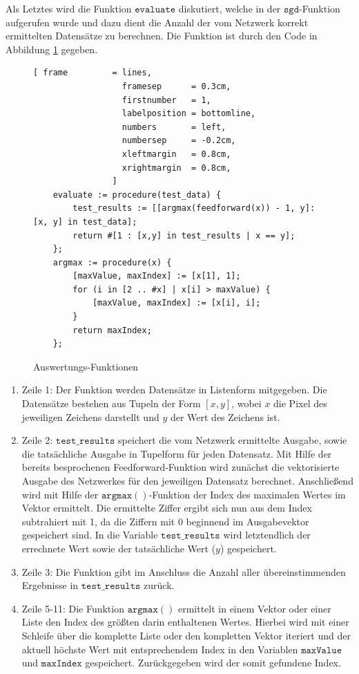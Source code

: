 \noindent
Als Letztes wird die Funktion $\mathtt{evaluate}$ diskutiert, welche in der $\mathtt{sgd}$-Funktion aufgerufen wurde und dazu dient die Anzahl der vom Netzwerk korrekt ermittelten Datensätze zu berechnen. Die Funktion ist durch den Code in Abbildung \ref{fig:eval_func} gegeben.
\begin{figure}
\begin{Verbatim}[ frame         = lines, 
                  framesep      = 0.3cm, 
                  firstnumber   = 1,
                  labelposition = bottomline,
                  numbers       = left,
                  numbersep     = -0.2cm,
                  xleftmargin   = 0.8cm,
                  xrightmargin  = 0.8cm,
                ]
    evaluate := procedure(test_data) {
        test_results := [[argmax(feedforward(x)) - 1, y]: [x, y] in test_data];	
        return #[1 : [x,y] in test_results | x == y];
    };
    argmax := procedure(x) {
        [maxValue, maxIndex] := [x[1], 1];
        for (i in [2 .. #x] | x[i] > maxValue) {
            [maxValue, maxIndex] := [x[i], i];
        }
        return maxIndex;
    };
\end{Verbatim}
\vspace*{-0.3cm}
\caption{Auswertungs-Funktionen}
\label{fig:eval_func}
\end{figure}
\begin{enumerate}
\item Zeile 1: Der Funktion werden Datensätze in Listenform mitgegeben. Die Datensätze bestehen aus Tupeln der Form $[x,y]$, wobei $x$ die Pixel des jeweiligen Zeichens darstellt und $y$ der Wert des Zeichens ist.
\item Zeile 2: $\mathtt{test\_results}$ speichert die vom Netzwerk ermittelte Ausgabe, sowie die tatsächliche Ausgabe in Tupelform für jeden Datensatz. Mit Hilfe der bereits besprochenen Feedforward-Funktion wird zunächst die vektorisierte Ausgabe des Netzwerkes für den jeweiligen Datensatz berechnet. Anschließend wird mit Hilfe der $\mathtt{argmax()}$-Funktion der Index des maximalen Wertes im Vektor ermittelt. Die ermittelte Ziffer ergibt sich nun aus dem Index subtrahiert mit 1, da die Ziffern mit 0 beginnend im Ausgabevektor gespeichert sind. In die Variable $\mathtt{test\_results}$ wird letztendlich der errechnete Wert sowie der tatsächliche Wert ($y$) gespeichert.
\item Zeile 3: Die Funktion gibt im Anschluss die Anzahl aller übereinstimmenden Ergebnisse in $\mathtt{test\_results}$ zurück.
\item Zeile 5-11: Die Funktion $\mathtt{argmax()}$ ermittelt in einem Vektor oder einer Liste den Index des größten darin enthaltenen Wertes. Hierbei wird mit einer Schleife über die komplette Liste oder den kompletten Vektor iteriert und der aktuell höchste Wert mit entsprechendem Index in den Variablen $\mathtt{maxValue}$ und $\mathtt{maxIndex}$ gespeichert. Zurückgegeben wird der somit gefundene Index.
\end{enumerate}

